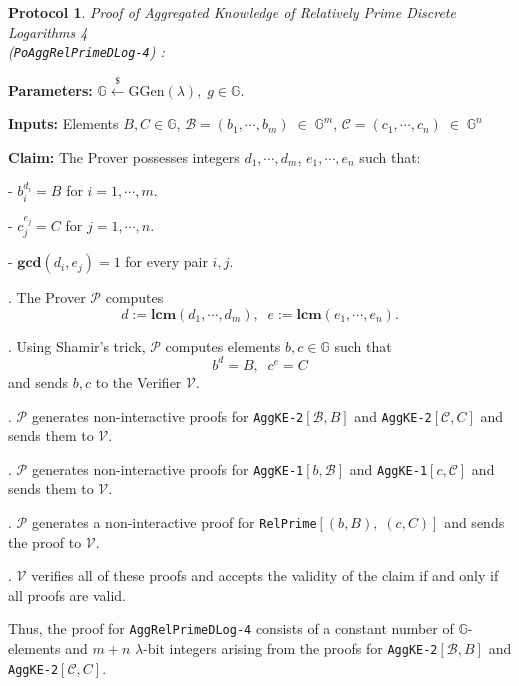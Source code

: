 \documentclass[11pt, lettersize, notitlepage, leqno, footskip=0.6cm]{article}
\newcommand{\mc}{\mathcal}
\newcommand{\mb}{\mathbb}
\newcommand{\mbf}{\mathbf}
\newcommand{\mr}{\mathrm}
\newcommand{\lam}{\lambda}
\newcommand{\lamb}{\lambda}
\newcommand{\mP}{\mc{P}}
\newcommand{\vs}{\vspace{-0.15cm}}
\newcommand{\LCM}{\mbf{lcm}}
\newcommand{\GCD}{\mbf{gcd}}
\newtheorem{Prot}[Thm]{Protocol}
\numberwithin{equation}{section}
\begin{document}
\begin{Prot} \normalfont \textit{Proof of Aggregated Knowledge of Relatively Prime Discrete Logarithms} 4\\ (\verb|PoAggRelPrimeDLog-4|) :\end{Prot}\vspace{-0.3cm}

\noindent \textbf{Parameters:} $\mb{G}\xleftarrow{\$} \mr{GGen}(\lamb), \; g\in \mb{G}$.

\noindent \textbf{Inputs:} Elements $B, C\in \mb{G}$,\;  $\mc{B} = (b_1,\cdots, b_m)\;\in\;\mb{G}^m$,\;\; $\mc{C} = (c_1,\cdots, c_n)\;\in\;\mb{G}^n$

\noindent \textbf{Claim:} The Prover possesses integers $ d_1,\cdots, d_m$,\; $e_1,\cdots,e_n$ such that:

\noindent - $b_i^{d_i} = B$ for $i = 1,\cdots, m$.

\noindent - $c_j^{e_j} = C$ for $j = 1,\cdots, n$.

\noindent - $\GCD(d_i, e_j) = 1$ for every pair $i, j$.

\begin{prf1} . The Prover $\mc{P}$ computes \vs $${d}:= \LCM(d_1,\cdots,d_m),\;\; {e}:= \LCM(e_1,\cdots,e_n).$$

. Using Shamir's trick, $\mP$ computes elements $b, c \in \mb{G}$ such that \vspace{-0.15cm}$$b^{d} = B,\;\; c^{e} = C$$ and sends $b,c$ to the Verifier $\mc{V}$.

. $\mc{P}$ generates non-interactive proofs for \verb|AggKE-2|$[\mc{B}, B]$ and \verb|AggKE-2|$[\mc{C}, C]$ and sends them to $\mc{V}$.

. $\mc{P}$ generates non-interactive proofs for \verb|AggKE-1|$[b,\mc{B}]$ and \verb|AggKE-1|$[c, \mc{C}]$ and sends them to $\mc{V}$.

. $\mc{P}$ generates a non-interactive proof for \verb|RelPrime|$[(b,B),\;(c,C)]$ and sends the proof to $\mc{V}$.

. $\mc{V}$ verifies all of these proofs and accepts the validity of the claim if and only if all proofs are valid.\end{prf1}

\noindent Thus, the proof for \verb|AggRelPrimeDLog-4| consists of a constant number of $\mb{G}$-elements and $m+n$ $\lam$-bit integers arising from the proofs for \verb|AggKE-2|$[\mc{B}, B]$ and \verb|AggKE-2|$[\mc{C}, C]$.
\end{document}
